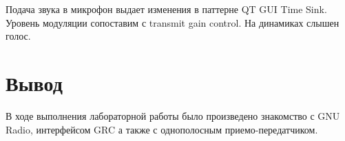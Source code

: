 \documentclass{article}
\begin{document}
Подача звука в микрофон выдает изменения в паттерне QT GUI Time Sink. Уровень модуляции сопоставим с transmit gain control. На динамиках слышен голос.

\section*{Вывод}
В ходе выполнения лабораторной работы было произведено знакомство с GNU Radio, интерфейсом GRC а также с однополосным приемо-передатчиком.
\end{document}
